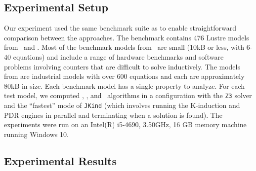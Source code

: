 \subsection{Experimental Setup}
Our experiment used the same benchmark suite as \cite{Ghass16} to enable straightforward comparison between the approaches. The benchmark contains 476 Lustre models  from~\cite{Hagen08:FMCAD} and \cite{QFCS15:backes,hilt2013}.
Most of the benchmark models from~\cite{Hagen08:FMCAD} are small (10kB or less, with 6-40 equations) and include a range of hardware benchmarks and software problems involving counters that are difficult to solve inductively.
The models from \cite{QFCS15:backes,hilt2013} are industrial models with over 600 equations and each are approximately 80kB in size.  Each benchmark model has a single property to analyze.  For each test model, we computed \aivcalg , \ucalg , and \ucbfalg ~algorithms in a configuration with the \texttt{Z3} solver and the ``fastest'' mode of \texttt{JKind} (which involves running the K-induction and PDR engines in parallel and terminating when a solution is found). The experiments were run on an  Intel(R) i5-4690, 3.50GHz, 16 GB memory machine running Windows 10.



\subsection{Experimental Results}

 